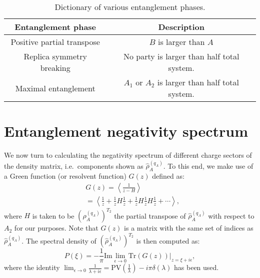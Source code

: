 \documentclass[aps,pra,reprint,superscriptaddress,twocolumn,notitlepage]{revtex4-1}
\newcommand{\Tr}{\text{Tr}}
\numberwithin{equation}{section}
\begin{document}
\begin{table}[]
    \centering
{\footnotesize 
\renewcommand{\arraystretch}{1.2}
\begin{tabular}{cc}
    \hline
    Entanglement phase & Description \\
    \hline
    \hline
Positive partial transpose & $B$ is larger than $A$
\\
Replica symmetry breaking & No party is larger than half total system.
\\
Maximal entanglement  & $A_1$ or $A_2$ is larger than half total system.     \\
     \hline
\end{tabular}
}
\renewcommand{\arraystretch}{1}
    \caption{Dictionary of various entanglement phases.}
    \label{tab:dictionary}
\end{table}



\section{Entanglement negativity spectrum}
\label{sec:spectraldensity}



We now turn to calculating the negativity spectrum of different charge sectors of the density matrix, i.e.~components shown as $\hat \rho_{A}^{(q_A)}$. To this end, we make use of a Green function (or resolvent function) $G(z)$ defined as:
\begin{equation}
\label{eq:resolvent}
\begin{aligned}
  &  G(z) = \left\langle\frac{1}{ z - H } \right\rangle \\
    &= \left\langle \frac{1}{z} + \frac{1}{z} H \frac{1}{z}  + \frac{1}{z} H  \frac{1}{z} H  \frac{1}{z} + \cdots \right\rangle,
\end{aligned}
\end{equation}
where $H$ is taken to be $(\hat\rho_{A}^{(q_A)})^{T_2}$ the partial transpose of $\hat \rho_{A}^{(q_A)}$ with respect to $A_2$ for our purposes. Note that $G(z)$ is a matrix with the same set of indices as $\hat \rho_{A}^{(q_A)}$. The spectral density of $(\hat\rho_{A}^{(q_A)})^{T_2}$ is then computed as:
\begin{equation}
    \label{eq:principal-value}
    P(\xi) = - \frac{1}{\pi} \text{Im} \lim_{\epsilon \to 0} \Tr\left( G(z) \right) \big|_{z=\xi+i\epsilon},
\end{equation}
where the identity $\lim_{\epsilon \to 0} \frac{1}{\lambda+i\epsilon} = \text{PV} (\frac1\lambda) -i\pi \delta(\lambda)$ has been used. 
\end{document}
